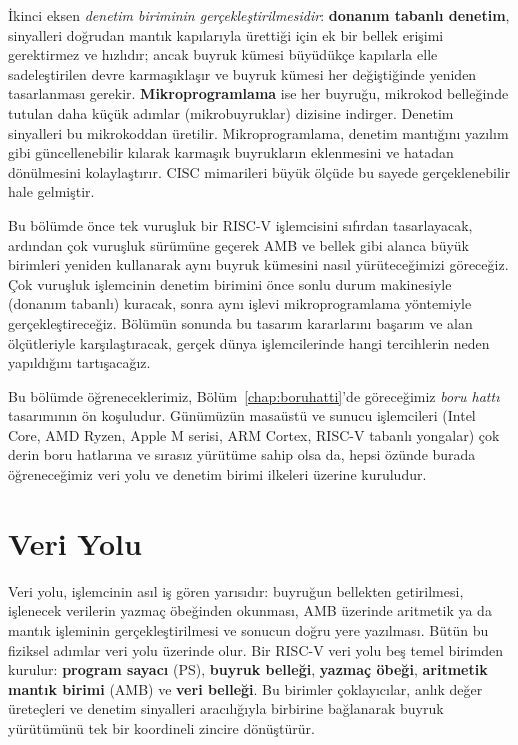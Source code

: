 İkinci eksen \emph{denetim biriminin gerçekleştirilmesidir}: \textbf{donanım tabanlı denetim}, sinyalleri doğrudan mantık kapılarıyla ürettiği için ek bir bellek erişimi gerektirmez ve hızlıdır; ancak buyruk kümesi büyüdükçe kapılarla elle sadeleştirilen devre karmaşıklaşır ve buyruk kümesi her değiştiğinde yeniden tasarlanması gerekir. \textbf{Mikroprogramlama} ise her buyruğu, mikrokod belleğinde tutulan daha küçük adımlar (mikrobuyruklar) dizisine indirger. Denetim sinyalleri bu mikrokoddan üretilir. Mikroprogramlama, denetim mantığını yazılım gibi güncellenebilir kılarak karmaşık buyrukların eklenmesini ve hatadan dönülmesini kolaylaştırır. CISC mimarileri büyük ölçüde bu sayede gerçeklenebilir hale gelmiştir.

Bu bölümde önce tek vuruşluk bir RISC-V işlemcisini sıfırdan tasarlayacak, ardından çok vuruşluk sürümüne geçerek AMB ve bellek gibi alanca büyük birimleri yeniden kullanarak aynı buyruk kümesini nasıl yürüteceğimizi göreceğiz. Çok vuruşluk işlemcinin denetim birimini önce sonlu durum makinesiyle (donanım tabanlı) kuracak, sonra aynı işlevi mikroprogramlama yöntemiyle gerçekleştireceğiz. Bölümün sonunda bu tasarım kararlarını başarım ve alan ölçütleriyle karşılaştıracak, gerçek dünya işlemcilerinde hangi tercihlerin neden yapıldığını tartışacağız.

Bu bölümde öğreneceklerimiz, Bölüm~\ref{chap:boruhatti}'de göreceğimiz \emph{boru hattı} tasarımının ön koşuludur. Günümüzün masaüstü ve sunucu işlemcileri (Intel Core, AMD Ryzen, Apple M serisi, ARM Cortex, RISC-V tabanlı yongalar) çok derin boru hatlarına ve sırasız yürütüme sahip olsa da, hepsi özünde burada öğreneceğimiz veri yolu ve denetim birimi ilkeleri üzerine kuruludur.

\section{Veri Yolu}
\label{sec:veriyolu}

Veri yolu, işlemcinin asıl iş gören yarısıdır: buyruğun bellekten getirilmesi, işlenecek verilerin yazmaç öbeğinden okunması, AMB üzerinde aritmetik ya da mantık işleminin gerçekleştirilmesi ve sonucun doğru yere yazılması. Bütün bu fiziksel adımlar veri yolu üzerinde olur. Bir RISC-V veri yolu beş temel birimden kurulur: \textbf{program sayacı} (PS), \textbf{buyruk belleği}, \textbf{yazmaç öbeği}, \textbf{aritmetik mantık birimi} (AMB) ve \textbf{veri belleği}. Bu birimler çoklayıcılar, anlık değer üreteçleri ve denetim sinyalleri aracılığıyla birbirine bağlanarak buyruk yürütümünü tek bir koordineli zincire dönüştürür.

